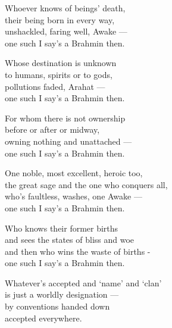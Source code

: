\begin{MyDescription}{}
Whoever knows of beings' death,\\
their being born in every way,\\
unshackled, faring well, Awake —\\
one such I say's a Brahmin then.
\end{MyDescription}

\begin{MyDescription}{}
Whose destination is unknown\\
to humans, spirits or to gods,\\
pollutions faded, Arahat —\\
one such I say's a Brahmin then.
\end{MyDescription}

\begin{MyDescription}{}
For whom there is not ownership\\
before or after or midway,\\
owning nothing and unattached —\\
one such I say's a Brahmin then.
\end{MyDescription}

\begin{MyDescription}{}
One noble, most excellent, heroic too,\\
the great sage and the one who conquers all,\\
who's faultless, washes, one Awake —\\
one such I say's a Brahmin then.
\end{MyDescription}

\begin{MyDescription}{}
Who knows their former births\\
and sees the states of bliss and woe\\
and then who wins the waste of births -\\
one such I say's a Brahmin then.
\end{MyDescription}

\begin{MyDescription}{}
Whatever's accepted and `name' and `clan'\\
is just a worldly designation —\\
by conventions handed down\\
accepted everywhere.
\end{MyDescription}

